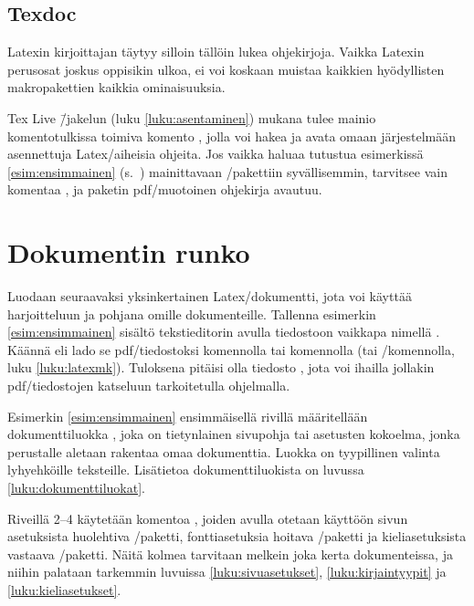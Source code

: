 \subsection{Texdoc}

Latexin kirjoittajan täytyy silloin tällöin lukea ohjekirjoja. Vaikka
Latexin perusosat joskus oppisikin ulkoa, ei voi koskaan muistaa
kaikkien hyödyllisten makropakettien kaikkia ominaisuuksia.

Tex Live \=/jakelun (luku \ref{luku:asentaminen}) mukana tulee mainio
komentotulkissa toimiva komento , jolla voi hakea ja avata
omaan järjestelmään asennettuja Latex\-/aiheisia ohjeita. Jos vaikka
haluaa tutustua esimerkissä \ref{esim:ensimmainen}
(s.~\pageref{esim:ensimmainen}) mainittavaan
\-/pakettiin syvällisemmin, tarvitsee vain komentaa
, ja paketin pdf\-/muotoinen ohjekirja avautuu.

\section{Dokumentin runko}

Luodaan seuraavaksi yksinkertainen Latex\-/dokumentti, jota voi käyttää
harjoitteluun ja pohjana omille dokumenteille. Tallenna esimerkin
\ref{esim:ensimmainen} sisältö tekstieditorin avulla tiedostoon vaikkapa
nimellä . Käännä eli lado se pdf\-/tiedostoksi
komennolla  tai komennolla  (tai \-/komennolla, luku
\ref{luku:latexmk}). Tuloksena pitäisi olla tiedosto ,
jota voi ihailla jollakin pdf\-/tiedostojen katseluun tarkoitetulla
ohjelmalla.

Esimerkin \ref{esim:ensimmainen} ensimmäisellä rivillä määritellään
dokumenttiluokka , joka on tietynlainen sivupohja tai
asetusten kokoelma, jonka perustalle aletaan rakentaa omaa dokumenttia.
Luokka  on tyypillinen valinta lyhyehköille teksteille.
Lisätietoa dokumenttiluokista on luvussa \ref{luku:dokumenttiluokat}.

Riveillä 2--4 käytetään komentoa , joiden avulla
otetaan käyttöön sivun asetuksista huolehtiva
\-/paketti, fontti\-asetuksia hoitava
\-/paketti ja kieli\-asetuksista vastaava
\-/paketti. Näitä kolmea tarvitaan melkein joka
kerta dokumenteissa, ja niihin palataan tarkemmin luvuissa
\ref{luku:sivuasetukset}, \ref{luku:kirjaintyypit} ja
\ref{luku:kieliasetukset}.

